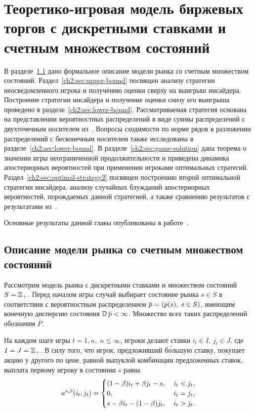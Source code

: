 \chapter{Теоретико-игровая модель биржевых торгов с дискретными ставками и счетным множеством состояний} \label{chapt2}
{
\newcommand{\s}{\ensuremath{s}}
\newcommand{\LL}{L^1(\{s^2\})}
\newcommand{\PM}{\ensuremath{\overline{P}}}

В разделе~\ref{ch2:sec:intro} дано формальное описание модели рынка со счетным множеством состояний.
Раздел~\ref{ch2:sec:upper-bound} посвящен анализу стратегии неосведомленного игрока и получению оценки сверху на выигрыш инсайдера.
Построение стратегии инсайдера и получение оценки снизу его выигрыша проведено в разделе~\ref{ch2:sec:lower-bound}.
Рассматриваемая стратегия основана на представлении вероятностных распределений в виде суммы распределений с двухточечным носителем из~\cite{domansky11}.
Вопросы сходимости по норме рядов в разложении распределений с бесконечным носителем также исследованы в разделе~\ref{ch2:sec:lower-bound}.
В разделе~\ref{ch2:sec:game-solution} дана теорема о значении игры неограниченной продолжительности и приведена динамика апостериорных вероятностей при применении игроками оптимальных стратегий.
Раздел~\ref{ch2:sec:optimal-strategy2} посвящен построению второй оптимальной стратегии инсайдера, анализу случайных блужданий апостериорных вероятностей, порождаемых данной стратегией, а также сравнению результатов с результатами из~\cite{domansky11}.

Основные результаты данной главы опубликованы в работе~\cite{pyanykh:orm2016}.

\section{Описание модели рынка со счетным множеством состояний}
\label{ch2:sec:intro}

Рассмотрим модель рынка с дискретными ставками и множеством состояний $S = \mathbb{Z}_+$.
Перед началом игры случай выбирает состояние рынка $\s \in S$ в соответствии с вероятностным распределением $\pd = (\pc{s}, \; s \in S)$, имеющим конечную дисперсию состояния $\D \pd < \infty$.
Множество всех таких распределений обозначим $\PM$.

На каждом шаге игры $t = \overline{1,n}, \; n \leqslant \infty$, игроки делают ставки $i_t \in I, \, j_t \in J$, где $I = J = \mathbb{Z}_+$.
В силу того, что игрок, предложивший б\'{о}льшую ставку, покупает акцию у другого по цене, равной выпуклой комбинации предложенных ставок, выплата первому игроку в состоянии $s$ равна
\begin{equation*}
  \as(i_t, j_t) =
  \begin{cases}
    (1-\beta) i_t + \beta j_t - s, &\; i_t < j_t, \\
    0, &\; i_t = j_t, \\
    s - \beta i_t - (1-\beta)j_t, &\; i_t > j_t.
  \end{cases}
\end{equation*}

}
